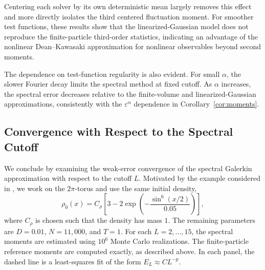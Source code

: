 \documentclass[a4paper,12pt]{article}
\begin{document}
Centering each solver by its own deterministic mean largely removes this effect and more directly isolates the third centered fluctuation moment. For smoother test functions, these results show that the linearized-Gaussian model does not reproduce the finite-particle third-order statistics, indicating an advantage of the nonlinear Dean--Kawasaki approximation for nonlinear observables beyond second moments.



The dependence on test-function regularity is also evident. For small $\alpha$, the slower Fourier decay limits the spectral method at fixed cutoff. As $\alpha$ increases, the spectral error decreases relative to the finite-volume and linearized-Gaussian approximations, consistently with the $\varepsilon^\alpha$ dependence in Corollary~\ref{cor:moments}.


\subsection{Convergence with Respect to the Spectral Cutoff}
\label{subsec:spectral_convergence}

We conclude by examining the weak-error convergence of the spectral
Galerkin approximation with respect to the cutoff $L$. Motivated by the example considered in \cite{Cornalba2023}, we work on the
$2\pi$-torus and use the same initial density,
\[
\rho_0(x)
=
C_\rho
\left[
3-
2\exp\left(
-\frac{\sin^6(x/2)}{0.05}
\right)
\right],
\]
where $C_\rho$ is chosen such that the density has mass $1$.
The remaining parameters are $D=0.01$, $N=11{,}000$, and $T=1$.
For each $L=2,\ldots,15$, the spectral moments are estimated using
$10^6$ Monte Carlo realizations. The finite-particle reference moments are
computed exactly, as described above.
In each panel, the dashed line is a
least-squares fit of the form
$
E_L\approx CL^{-p}.
$
\end{document}
